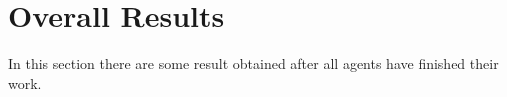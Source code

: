 \documentclass[12pt]{article}
\begin{document}
    \newpage

    \section{Overall Results}
    In this section there are some result obtained after all agents have finished their work.

    \begin{figure}[H]
        \centering     %
    \end{figure}
\end{document}
